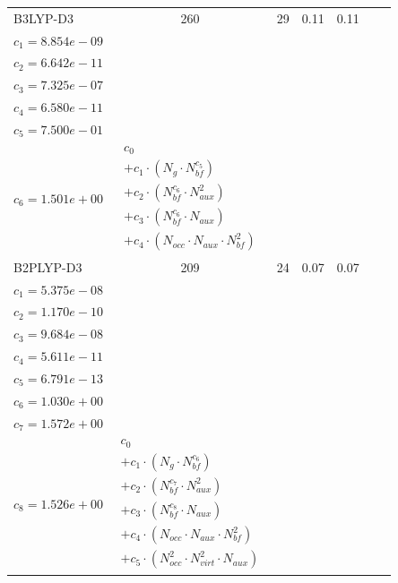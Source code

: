 \begin{longtable}{|l|c|c|c|c|p{3.2cm}|p{5.0cm}|}
B3LYP-D3 & 260 & 29 & 0.11 & 0.11 & \begin{tabular}{l}\(c_{0}=4.360e+00\) \\ \(c_{1}=8.854e-09\) \\ \(c_{2}=6.642e-11\) \\ \(c_{3}=7.325e-07\) \\ \(c_{4}=6.580e-11\) \\ \(c_{5}=7.500e-01\) \\ \(c_{6}=1.501e+00\)\end{tabular} & $\begin{array}{l}c_{0} \\ + c_{1}  \cdot  (N_{g}  \cdot  N_{bf} ^{c_{5}}) \\ + c_{2}  \cdot  (N_{bf} ^{c_{6}}  \cdot  N_{aux}^{2}) \\ + c_{3}  \cdot  (N_{bf} ^{c_{6}}  \cdot  N_{aux}) \\ + c_{4}  \cdot  (N_{occ}  \cdot  N_{aux}  \cdot  N_{bf} ^{2})\end{array}$ \\ 
\hline
B2PLYP-D3 & 209 & 24 & 0.07 & 0.07 & \begin{tabular}{l}\(c_{0}=9.990e-01\) \\ \(c_{1}=5.375e-08\) \\ \(c_{2}=1.170e-10\) \\ \(c_{3}=9.684e-08\) \\ \(c_{4}=5.611e-11\) \\ \(c_{5}=6.791e-13\) \\ \(c_{6}=1.030e+00\) \\ \(c_{7}=1.572e+00\) \\ \(c_{8}=1.526e+00\)\end{tabular} & $\begin{array}{l}c_{0} \\ + c_{1}  \cdot  (N_{g}  \cdot  N_{bf} ^{c_{6}}) \\ + c_{2}  \cdot  (N_{bf} ^{c_{7}}  \cdot  N_{aux} ^{2}) \\ + c_{3}  \cdot  (N_{bf} ^{c_{8}}  \cdot  N_{aux}) \\ + c_{4}  \cdot  (N_{occ}  \cdot  N_{aux}  \cdot  N_{bf} ^{2}) \\ + c_{5}  \cdot  (N_{occ} ^{2}  \cdot  N_{virt} ^{2}  \cdot  N_{aux})\end{array}$ \\ 
\hline
\end{longtable}

